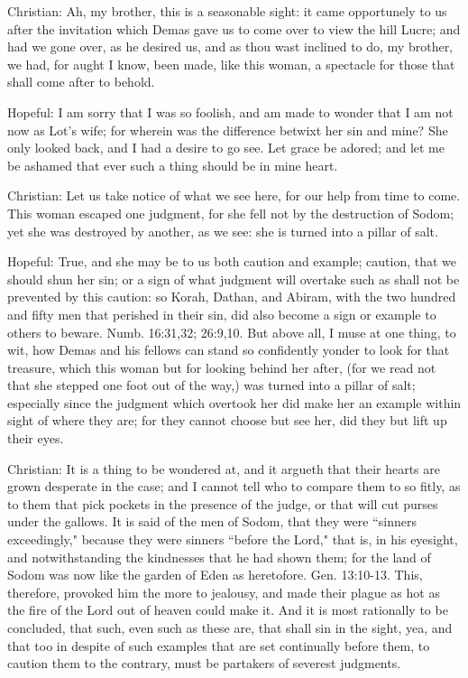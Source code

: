 Christian: Ah, my brother, this is a seasonable sight: it came opportunely to us after the invitation which Demas gave us to come over to view the hill Lucre; and had we gone over, as he desired us, and as thou wast inclined to do, my brother, we had, for aught I know, been made, like this woman, a spectacle for those that shall come after to behold.

Hopeful: I am sorry that I was so foolish, and am made to wonder that I am not now as Lot's wife; for wherein was the difference betwixt her sin and mine? She only looked back, and I had a desire to go see. Let grace be adored; and let me be ashamed that ever such a thing should be in mine heart.

Christian: Let us take notice of what we see here, for our help from time to come. This woman escaped one judgment, for she fell not by the destruction of Sodom; yet she was destroyed by another, as we see: she is turned into a pillar of salt.

Hopeful: True, and she may be to us both caution and example; caution, that we should shun her sin; or a sign of what judgment will overtake such as shall not be prevented by this caution: so Korah, Dathan, and Abiram, with the two hundred and fifty men that perished in their sin, did also become a sign or example to others to beware. Numb. 16:31,32; 26:9,10. But above all, I muse at one thing, to wit, how Demas and his fellows can stand so confidently yonder to look for that treasure, which this woman but for looking behind her after, (for we read not that she stepped one foot out of the way,) was turned into a pillar of salt; especially since the judgment which overtook her did make her an example within sight of where they are; for they cannot choose but see her, did they but lift up their eyes.

Christian: It is a thing to be wondered at, and it argueth that their hearts are grown desperate in the case; and I cannot tell who to compare them to so fitly, as to them that pick pockets in the presence of the judge, or that will cut purses under the gallows. It is said of the men of Sodom, that they were ``sinners exceedingly," because they were sinners ``before the Lord," that is, in his eyesight, and notwithstanding the kindnesses that he had shown them; for the land of Sodom was now like the garden of Eden as heretofore. Gen. 13:10-13. This, therefore, provoked him the more to jealousy, and made their plague as hot as the fire of the Lord out of heaven could make it. And it is most rationally to be concluded, that such, even such as these are, that shall sin in the sight, yea, and that too in despite of such examples that are set continually before them, to caution them to the contrary, must be partakers of severest judgments.

